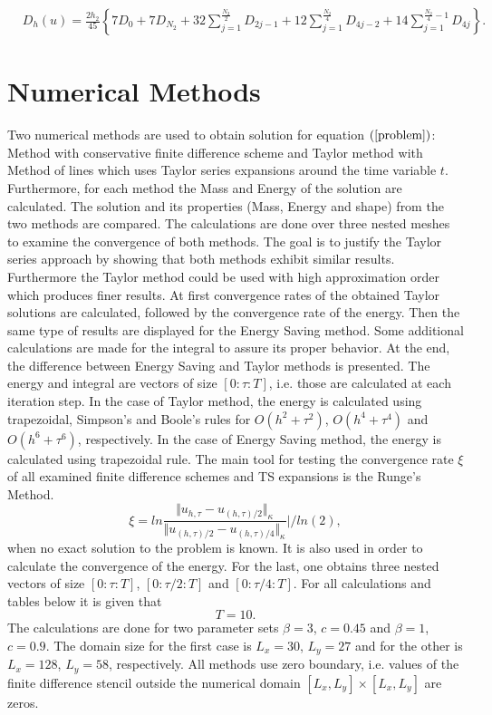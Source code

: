 \documentclass{article}
\newcommand{\rf}[1]{(\ref{#1})}
\begin{document}
\begin{align}\label{quadr6-2D}
&D_h(u) =
\frac{2h_2}{45} 
\left\{
7D_{0}+7D_{N_2}+32 \sum_{j=1}^{\frac{N_2}{2}}D_{2j-1}
+12\sum_{j=1}^{\frac{N_2}{4}}D_{4j-2}
+14 \sum_{j=1}^{\frac{N_2}{4}-1}D_{4j}
\right\}.
\end{align}

\section{Numerical Methods}

Two numerical methods are used to obtain solution for equation $\rf{problem}$: Method with conservative finite difference scheme and Taylor method with Method of lines which uses Taylor series expansions around the time variable $t$. Furthermore, for each method the Mass and Energy of the solution are calculated. The solution and its properties (Mass, Energy and shape) from the two methods are compared. The calculations are done over three nested meshes to examine the convergence of both methods. The goal is to justify the Taylor series approach by showing that both methods exhibit similar results. Furthermore the Taylor method could be used with high approximation order which produces finer results.
At first convergence rates of the obtained Taylor solutions are calculated, followed by the convergence rate of the energy. Then the same type of results are displayed for the Energy Saving method. Some additional calculations are made for the integral to assure its proper behavior. At the end, the difference between Energy Saving and Taylor methods is presented. The energy and integral are vectors of size $[0:\tau:T]$, i.e. those are calculated at each iteration step. In the case of Taylor method, the energy is calculated using trapezoidal, Simpson's and Boole's rules for $O(h^{2} + \tau^2 )$, $O(h^{4} + \tau^4 )$ and $O(h^{6} + \tau^6 )$, respectively. In the case of Energy Saving method, the energy is calculated using trapezoidal rule. The main tool for testing the convergence rate $\xi$ of all examined finite difference schemes and TS expansions is the Runge's Method. 
\begin{equation}\label{Runge}
\xi = ln  \frac{\Vert u_{h,\tau} - u_{(h,\tau)/2} \Vert_\kappa } {\Vert  u_{(h,\tau)/2} - u_{(h,\tau)/4} \Vert_\kappa  } | / ln(2),
\end{equation}
when no exact solution to the problem is known. It is also used in order to calculate the convergence of the energy. For the last, one obtains three nested vectors of size $[0:\tau:T]$, $[0:\tau/2:T]$ and $[0:\tau/4:T]$. For all calculations and tables below it is given that $$T=10.$$ The calculations are done for two parameter sets $\beta = 3$, $c=0.45$ and $\beta = 1$, $c=0.9$. The domain size for the first case is $L_x = 30$, $L_y = 27$ and for the other is  $L_x = 128$, $L_y = 58$, respectively. All methods use zero boundary, i.e. values of the finite difference stencil outside the numerical domain $[L_x, L_y] \times [L_x, L_y]$ are zeros.
\end{document}

